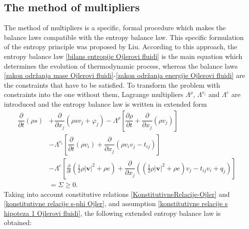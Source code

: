 \documentclass[a4paper,fleqn]{cas-sc}
\theoremstyle{definition}
\begin{document}
\subsection{The method of multipliers} 

The method of multipliers is a specific, formal procedure which makes the balance laws compatible with the entropy balance law. This specific formulation of the entropy principle was proposed by Liu. According to this approach, the entropy balance law \eqref{bilans entropije Ojlerovi fluidi} is the main equation which determines the evolution of thermodynamic process, whereas the balance laws \eqref{zakon održanja mase Ojlerovi fluidi}-\eqref{zakon održanja energije Ojlerovi fluidi} are the constraints that have to be satisfied. To transform the problem with constraints into the one without them, Lagrange multipliers $\Lambda^\rho$, $\Lambda^{v_i}$ and $\Lambda^e$ are introduced and the entropy balance law is written in extended form
\begin{align} \label{prosirena entropijska nejednakost Ojlerovi fluidi}
	\dfrac{\partial}{\partial t}\left(\rho s\right)
	& +\dfrac{\partial}{\partial x_j}\left(\rho sv_j+\varphi_j\right)
	-\Lambda^\rho\left[\dfrac{\partial\rho}{\partial t}+\dfrac{\partial}{\partial x_j}\left(\rho v_j\right)\right]
	\nonumber \\
	&-\Lambda^{v_i}\left[\dfrac{\partial}{\partial t}(\rho v_i)+\dfrac{\partial}{\partial x_j}\left(\rho v_i v_j -t_{ij}\right)\right] 
	\\
	&-\Lambda^ e\left[\frac{\partial}{\partial t}\left(\frac{1}{2}\rho\vert\mathbf{v}\vert ^2+\rho e\right)+\dfrac{\partial}{\partial x_j}\left(\left(\frac{1}{2}\rho\vert\mathbf{v}\vert ^2+\rho e\right)v_j-t_{ij}v_i+q_j\right)\right] 
	\nonumber \\
	& =\Sigma\geq 0. 
	\nonumber
\end{align}
Taking into account constitutive relations \eqref{KonstitutivneRelacije-Ojler} and \eqref{konstitutivne relacije s-phi Ojler}, and assumption \eqref{konstitutivne relacije s hipoteza 1 Ojlerovi fluidi}, the following extended entropy balance law is obtained: 
\end{document}
